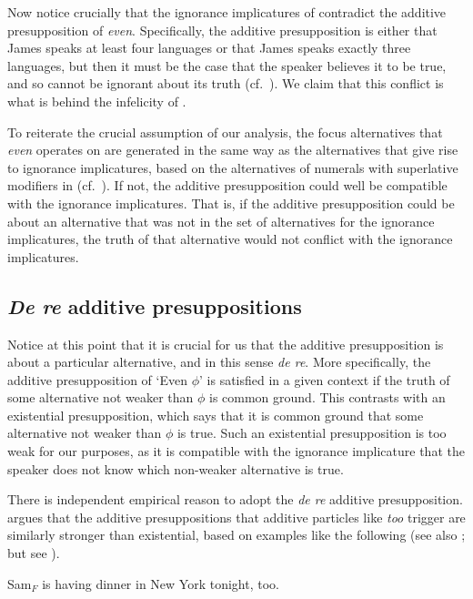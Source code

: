 \documentclass[output=paper]{langscibook}
\begin{document}
Now notice crucially that the ignorance implicatures of  contradict the additive presupposition of \textit{even}. Specifically, the additive presupposition is either that James speaks at least four languages or that James speaks exactly three languages, but then it must be the case that the speaker believes it to be true, and so cannot be ignorant about its truth (cf.\ \citealt{stalnaker}). We claim that this conflict is what is behind the infelicity of .

To reiterate the crucial assumption of our analysis, the focus alternatives that \textit{even} operates on are generated in the same way as the alternatives that give rise to ignorance implicatures, based on the alternatives of numerals with superlative modifiers in  (cf.\ \citealt{rooth:92, foxkatzir}). If not, the additive presupposition could well be compatible with the ignorance implicatures. That is, if the additive presupposition could be about an alternative that was not in the set of alternatives for the ignorance implicatures, the truth of that alternative would not conflict with the ignorance implicatures.

\subsection{\textit{De re} additive presuppositions}

Notice at this point that it is crucial for us that the additive presupposition is about a particular alternative, and in this sense \textit{de re}. More specifically, the additive presupposition of `Even $\phi$' is satisfied in a given context if the truth of some alternative not weaker than $\phi$ is common ground. This contrasts with an existential presupposition, which says that it is common ground that some alternative not weaker than $\phi$ is true. Such an existential presupposition is too weak for our purposes, as it is compatible with the ignorance implicature that the speaker does not know which non-weaker alternative is true.
  
There is independent empirical reason to adopt the \textit{de re} additive presupposition. \citet{kripke} argues that the additive presuppositions that additive particles like \textit{too} trigger are similarly stronger than existential, based on examples like the following (see also \citealt{geurtsvandersandt}; but see \citealt{ruys}).

    \ea Sam$_F$ is having dinner in New York tonight, too.\label{don-sud:ny}
    \z
\end{document}
